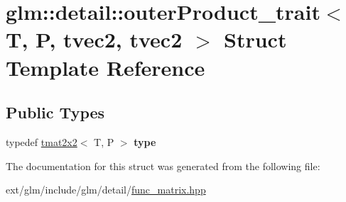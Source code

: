 \hypertarget{structglm_1_1detail_1_1outer_product__trait_3_01_t_00_01_p_00_01tvec2_00_01tvec2_01_4}{\section{glm\-:\-:detail\-:\-:outer\-Product\-\_\-trait$<$ T, P, tvec2, tvec2 $>$ Struct Template Reference}
\label{structglm_1_1detail_1_1outer_product__trait_3_01_t_00_01_p_00_01tvec2_00_01tvec2_01_4}
}
\subsection*{Public Types}
\begin{DoxyCompactItemize}
\item 
\hypertarget{structglm_1_1detail_1_1outer_product__trait_3_01_t_00_01_p_00_01tvec2_00_01tvec2_01_4_a390fb582fa7caa73e53f69181b3b334e}{typedef \hyperlink{structglm_1_1tmat2x2}{tmat2x2}$<$ T, P $>$ {\bfseries type}}\label{structglm_1_1detail_1_1outer_product__trait_3_01_t_00_01_p_00_01tvec2_00_01tvec2_01_4_a390fb582fa7caa73e53f69181b3b334e}

\end{DoxyCompactItemize}


The documentation for this struct was generated from the following file\-:\begin{DoxyCompactItemize}
\item 
ext/glm/include/glm/detail/\hyperlink{func__matrix_8hpp}{func\-\_\-matrix.\-hpp}\end{DoxyCompactItemize}
